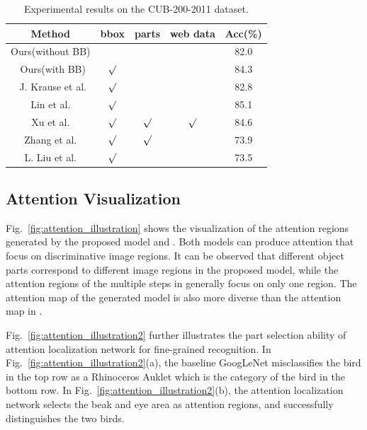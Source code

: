 \documentclass[runningheads]{llncs}
\begin{document}
\begin{table}[htb]
\begin{center}
\begin{tabular}
{c||c|c|c|c}\hline
Method &  bbox & parts & web data & Acc(\%) \\\hline\hline
Ours(without BB) &  &   &   &82.0 \\\
Ours(with BB) & $\surd$ & &   & 84.3 \\\
J. Krause et al. \cite{bd22} &  $\surd$ &  &  & 82.8 \\
Lin et al. \cite{bd16} & $\surd$ &    &   & 85.1 \\
Xu et al. \cite{bd23} & $\surd$ & $\surd$ & $\surd$ & 84.6 \\
Zhang et al. \cite{bd11} & $\surd$ & $\surd$ &   & 73.9 \\
L. Liu et al. \cite{bd26}     & $\surd$ &   &   & 73.5 \\                \hline
\end{tabular}
\caption{Experimental results on the CUB-200-2011 dataset.}
\vspace{-12pt}
\end{center}
\end{table}

\subsection{Attention Visualization}
Fig.~\ref{fig:attention_illustration} shows the visualization of the attention regions generated by the proposed model and \cite{bd3}.
Both models can produce attention that focus on discriminative image regions.
It can be observed that different object parts correspond to different image regions in the proposed model, while the attention regions of the multiple steps in \cite{bd3} generally focus on only one region.
The attention map of the generated model is also more diverse than the attention map in \cite{bd3}.

Fig.~\ref{fig:attention_illustration2} further illustrates the part selection ability of attention localization network for fine-grained recognition.
In Fig.~\ref{fig:attention_illustration2}(a), the baseline GoogLeNet misclassifies the bird in the top row as a Rhinoceros Auklet which is the category of the bird in the bottom row. In Fig.~\ref{fig:attention_illustration2}(b), the attention localization network selects the beak and eye area as attention regions, and successfully distinguishes the two birds.
\end{document}
